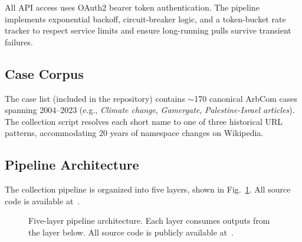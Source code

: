 \documentclass[conference]{IEEEtran}
\begin{document}
All API access uses OAuth2 bearer token authentication. The pipeline
implements exponential backoff, circuit-breaker logic, and a token-bucket
rate tracker to respect service limits and ensure long-running pulls survive
transient failures.

\subsection{Case Corpus}

The case list (included in the repository) contains
$\sim$170 canonical ArbCom cases spanning 2004--2023 (e.g., \textit{Climate
change}, \textit{Gamergate}, \textit{Palestine-Israel articles}). The
collection script resolves each short name to one of three historical URL
patterns, accommodating 20 years of namespace changes on Wikipedia.

\subsection{Pipeline Architecture}

The collection pipeline is organized into five layers, shown in
Fig.~\ref{fig:pipeline}. All source code is available at~\cite{b_repo}.

\begin{figure}[tb]
\centering
{}
\caption{Five-layer pipeline architecture. Each layer consumes outputs from
  the layer below. All source code is publicly available at~\cite{b_repo}.}
\label{fig:pipeline}
\end{figure}
\end{document}
